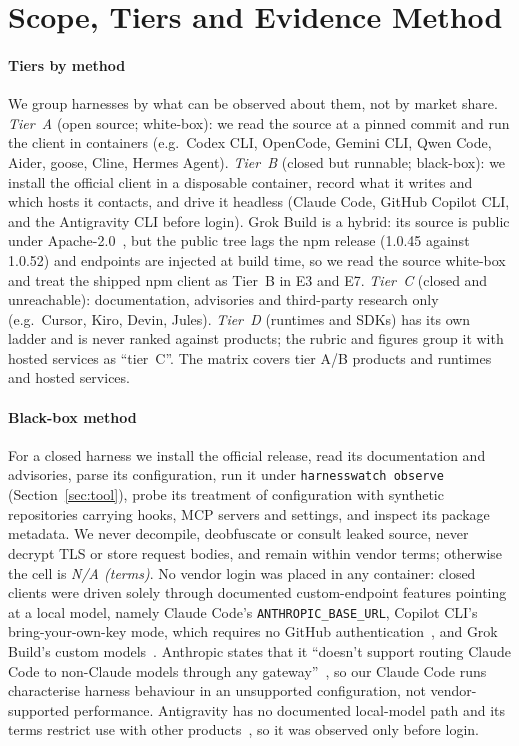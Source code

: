\section{Scope, Tiers and Evidence Method}\label{sec:method}

\paragraph*{Tiers by method} We group harnesses by what can be observed about them, not by market share.
\emph{Tier~A} (open source; white-box): we read the source at a pinned commit and run the client in containers (e.g.\ Codex CLI, OpenCode, Gemini CLI, Qwen Code, Aider, goose, Cline, Hermes Agent).
\emph{Tier~B} (closed but runnable; black-box): we install the official client in a disposable container, record what it writes and which hosts it contacts, and drive it headless (Claude Code, GitHub Copilot CLI, and the Antigravity CLI before login). Grok Build is a hybrid: its source is public under Apache-2.0\evD~\cite{grokbuild_repo}, but the public tree lags the npm release (1.0.45 against 1.0.52) and endpoints are injected at build time, so we read the source white-box and treat the shipped npm client as Tier~B in E3 and E7.
\emph{Tier~C} (closed and unreachable): documentation, advisories and third-party research only (e.g.\ Cursor, Kiro, Devin, Jules).
\emph{Tier~D} (runtimes and SDKs) has its own ladder and is never ranked against products; the rubric and figures group it with hosted services as ``tier~C''. The matrix covers \nHarnessesAB{} tier A/B products and \nHarnessesC{} runtimes and hosted services.

\paragraph*{Black-box method} For a closed harness we install the official release, read its documentation and advisories, parse its configuration, run it under \texttt{harnesswatch observe} (Section~\ref{sec:tool}), probe its treatment of configuration with synthetic repositories carrying hooks, MCP servers and settings, and inspect its package metadata. We never decompile, deobfuscate or consult leaked source, never decrypt TLS or store request bodies, and remain within vendor terms; otherwise the cell is \emph{N/A (terms)}. No vendor login was placed in any container: closed clients were driven solely through documented custom-endpoint features pointing at a local model, namely Claude Code's \texttt{ANTHROPIC\_BASE\_URL}, Copilot CLI's bring-your-own-key mode, which requires no GitHub authentication\evD~\cite{copilot_byok}, and Grok Build's custom models\evD~\cite{grokbuild_overview}. Anthropic states that it ``doesn't support routing Claude Code to non-Claude models through any gateway''\evD~\cite{cc_llm_gateway}, so our Claude Code runs characterise harness behaviour in an unsupported configuration, not vendor-supported performance. Antigravity has no documented local-model path and its terms restrict use with other products\evD~\cite{ag_terms}, so it was observed only before login.

